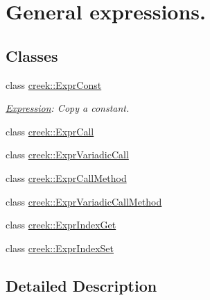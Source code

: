\hypertarget{group__expression__general}{}\section{General expressions.}
\label{group__expression__general}
\subsection*{Classes}
\begin{DoxyCompactItemize}
\item 
class \hyperlink{classcreek_1_1_expr_const}{creek\+::\+Expr\+Const}
\begin{DoxyCompactList}\small\item\em \hyperlink{classcreek_1_1_expression}{Expression}\+: Copy a constant. \end{DoxyCompactList}\item 
class \hyperlink{classcreek_1_1_expr_call}{creek\+::\+Expr\+Call}
\item 
class \hyperlink{classcreek_1_1_expr_variadic_call}{creek\+::\+Expr\+Variadic\+Call}
\item 
class \hyperlink{classcreek_1_1_expr_call_method}{creek\+::\+Expr\+Call\+Method}
\item 
class \hyperlink{classcreek_1_1_expr_variadic_call_method}{creek\+::\+Expr\+Variadic\+Call\+Method}
\item 
class \hyperlink{classcreek_1_1_expr_index_get}{creek\+::\+Expr\+Index\+Get}
\item 
class \hyperlink{classcreek_1_1_expr_index_set}{creek\+::\+Expr\+Index\+Set}
\end{DoxyCompactItemize}


\subsection{Detailed Description}

